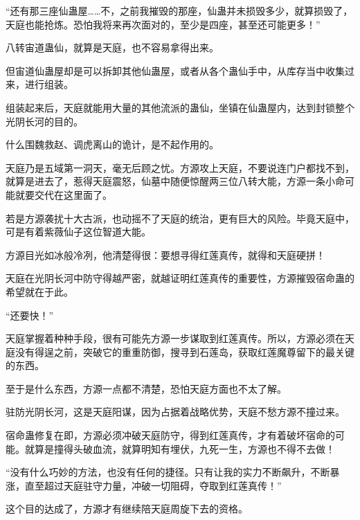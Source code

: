 \begin{this_body}
“还有那三座仙蛊屋……不，之前我摧毁的那座，仙蛊并未损毁多少，就算损毁了，天庭也能抢炼。恐怕我将来再次面对的，至少是四座，甚至还可能更多！”

八转宙道蛊仙，就算是天庭，也不容易拿得出来。

但宙道仙蛊屋却是可以拆卸其他仙蛊屋，或者从各个蛊仙手中，从库存当中收集过来，进行组装。

组装起来后，天庭就能用大量的其他流派的蛊仙，坐镇在仙蛊屋内，达到封锁整个光阴长河的目的。

什么围魏救赵、调虎离山的诡计，是不起作用的。

天庭乃是五域第一洞天，毫无后顾之忧。方源攻上天庭，不要说连门户都找不到，就算是进去了，惹得天庭震怒，仙墓中随便惊醒两三位八转大能，方源一条小命可能就要交代在这里面了。

若是方源袭扰十大古派，也动摇不了天庭的统治，更有巨大的风险。毕竟天庭中，可是有着紫薇仙子这位智道大能。

方源目光如冰般冷冽，他清楚得很：要想寻得红莲真传，就得和天庭硬拼！

天庭在光阴长河中防守得越严密，就越证明红莲真传的重要性，方源摧毁宿命蛊的希望就在于此。

“还要快！”

天庭掌握着种种手段，很有可能先方源一步谋取到红莲真传。所以，方源必须在天庭没有得逞之前，突破它的重重防御，搜寻到石莲岛，获取红莲魔尊留下的最关键的东西。

至于是什么东西，方源一点都不清楚，恐怕天庭方面也不太了解。

驻防光阴长河，这是天庭阳谋，因为占据着战略优势，天庭不愁方源不撞过来。

宿命蛊修复在即，方源必须冲破天庭防守，得到红莲真传，才有着破坏宿命的可能。就算是撞得头破血流，就算明知有埋伏，九死一生，方源也不得不去做！

“没有什么巧妙的方法，也没有任何的捷径。只有让我的实力不断飙升，不断暴涨，直至超过天庭驻守力量，冲破一切阻碍，夺取到红莲真传！”

这个目的达成了，方源才有继续陪天庭周旋下去的资格。

\end{this_body}


